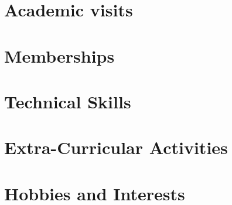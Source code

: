 \documentclass[margin,line]{res}
\begin{document}
\begin{resume}
\section{\sc Academic visits}
    
\section{\sc Memberships}
    
\section{\sc Technical Skills}
    
\section{\sc Extra-Curricular Activities}
    
\section{\sc Hobbies and Interests}
    
\end{resume}
\end{document}
